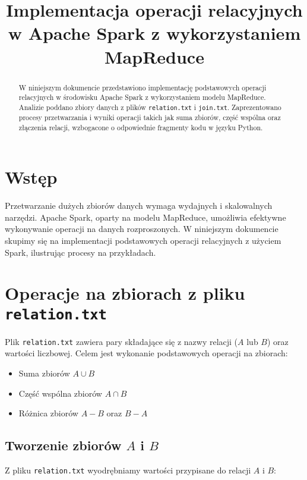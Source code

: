 \documentclass{article}
\title{Implementacja operacji relacyjnych w Apache Spark z wykorzystaniem MapReduce}
\author{}
\date{}
\begin{document}
\maketitle

\begin{abstract}
  W niniejszym dokumencie przedstawiono implementację podstawowych operacji relacyjnych w środowisku Apache Spark z wykorzystaniem modelu MapReduce. Analizie poddano zbiory danych z plików \texttt{relation.txt} i \texttt{join.txt}. Zaprezentowano procesy przetwarzania i wyniki operacji takich jak suma zbiorów, część wspólna oraz złączenia relacji, wzbogacone o odpowiednie fragmenty kodu w języku Python.
\end{abstract}

\tableofcontents

\section{Wstęp}

Przetwarzanie dużych zbiorów danych wymaga wydajnych i skalowalnych narzędzi. Apache Spark, oparty na modelu MapReduce, umożliwia efektywne wykonywanie operacji na danych rozproszonych. W niniejszym dokumencie skupimy się na implementacji podstawowych operacji relacyjnych z użyciem Spark, ilustrując procesy na przykładach.

\section{Operacje na zbiorach z pliku \texttt{relation.txt}}

Plik \texttt{relation.txt} zawiera pary składające się z nazwy relacji (\(A\) lub \(B\)) oraz wartości liczbowej. Celem jest wykonanie podstawowych operacji na zbiorach:

\begin{itemize}
    \item Suma zbiorów \(A \cup B\)
    \item Część wspólna zbiorów \(A \cap B\)
    \item Różnica zbiorów \(A - B\) oraz \(B - A\)
\end{itemize}

\subsection{Tworzenie zbiorów \(A\) i \(B\)}

Z pliku \texttt{relation.txt} wyodrębniamy wartości przypisane do relacji \(A\) i \(B\):
\end{document}
